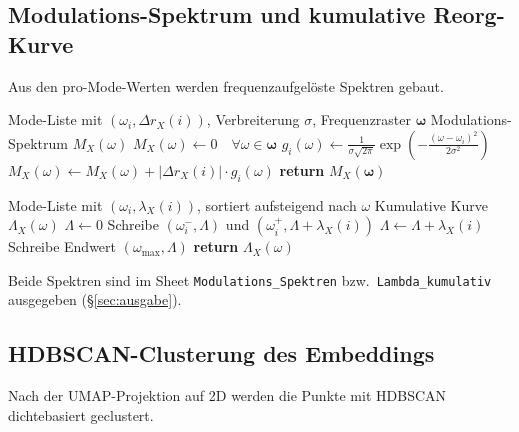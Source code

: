 \documentclass[11pt,a4paper,twoside]{article}
\theoremstyle{remark}
\begin{document}
\subsection{Modulations-Spektrum und kumulative Reorg-Kurve}
\label{app:pseudo-spektren}

Aus den pro-Mode-Werten werden frequenzaufgel\"oste Spektren gebaut.

\begin{algorithm}[H]
\caption{\textsc{ModulationsSpectrum}}
\begin{algorithmic}[1]
\Require Mode-Liste mit $(\omega_i, \Delta r_X(i))$, Verbreiterung $\sigma$,
         Frequenzraster $\boldsymbol{\omega}$
\Ensure Modulations-Spektrum $M_X(\omega)$
\State $M_X(\omega) \gets 0 \quad \forall \omega \in \boldsymbol{\omega}$
  \State $g_i(\omega) \gets \frac{1}{\sigma\sqrt{2\pi}}
         \exp\!\left(-\frac{(\omega - \omega_i)^2}{2\sigma^2}\right)$
  \State $M_X(\omega) \gets M_X(\omega) + |\Delta r_X(i)| \cdot g_i(\omega)$
\EndFor
\State \textbf{return} $M_X(\boldsymbol{\omega})$
\end{algorithmic}
\end{algorithm}

\begin{algorithm}[H]
\caption{\textsc{KumulativeReorg}}
\begin{algorithmic}[1]
\Require Mode-Liste mit $(\omega_i, \lambda_X(i))$, sortiert aufsteigend nach $\omega$
\Ensure Kumulative Kurve $\Lambda_X(\omega)$
\State $\Lambda \gets 0$
  \State Schreibe $(\omega_i^-, \Lambda)$ und $(\omega_i^+, \Lambda + \lambda_X(i))$
  \State $\Lambda \gets \Lambda + \lambda_X(i)$
\EndFor
\State Schreibe Endwert $(\omega_\text{max}, \Lambda)$
\State \textbf{return} $\Lambda_X(\omega)$
\end{algorithmic}
\end{algorithm}

Beide Spektren sind im Sheet \texttt{Modulations\_Spektren} bzw.\
\texttt{Lambda\_kumulativ} ausgegeben (\S\ref{sec:ausgabe}).

\subsection{HDBSCAN-Clusterung des Embeddings}
\label{app:pseudo-hdbscan}

Nach der UMAP-Projektion auf 2D werden die Punkte mit HDBSCAN
\cite{Campello2013} dichtebasiert geclustert.
\end{document}
